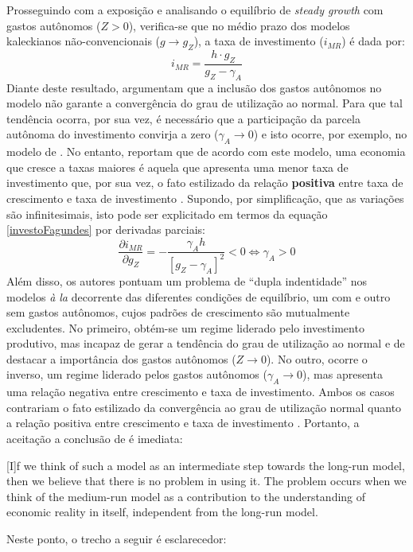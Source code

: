 Prosseguindo com a exposição e analisando o equilíbrio de \textit{steady growth} com gastos autônomos ($Z > 0$), verifica-se que no médio prazo dos modelos kaleckianos não-convencionais ($g\to g_Z$), a taxa de investimento ($i_{MR}$) é dada por:
\begin{equation}
\label{investoFagundes}
i_{MR} = \frac{h\cdot g_Z}{g_Z - \gamma_A}
\end{equation}
Diante deste resultado, \textcite{fagundes_role_2017} argumentam que a inclusão dos gastos autônomos no modelo não garante a convergência do grau de utilização ao normal. Para que tal tendência ocorra, por sua vez, é necessário que a participação da parcela autônoma do investimento convirja a zero ($\gamma_A \to 0$) e isto ocorre, por exemplo, no modelo de  \textcite{lavoie_convergence_2016}. 
No entanto, \textcite{fagundes_role_2017} reportam que de acordo com este modelo, uma economia que cresce a taxas maiores é aquela que apresenta uma menor taxa de investimento que, por sua vez, o fato estilizado da relação \textbf{positiva} entre taxa de crescimento e  taxa de investimento \cites{braga_investment_2018}{haluska_growth_2019}. Supondo, por simplificação, que as variações são infinitesimais, isto pode ser explicitado em termos da equação \ref{investoFagundes} por derivadas parciais:
$$
\frac{\partial i_{MR}}{\partial g_Z} = - \frac{\gamma_A h}{[g_Z - \gamma_A]^2} < 0 \Leftrightarrow \gamma_A > 0
$$
Além disso, os autores pontuam um problema de ``dupla indentidade'' nos modelos \textit{à la} \textcite{allain_tackling_2015} decorrente das diferentes condições de equilíbrio, um com e outro sem gastos autônomos, cujos padrões de crescimento são mutualmente excludentes. No primeiro, obtém-se um regime liderado pelo investimento produtivo, mas incapaz de gerar a tendência do grau de utilização ao normal e de destacar a importância dos gastos autônomos ($Z\to 0$). No outro, ocorre o inverso, um regime liderado pelos gastos autônomos ($\gamma_A \to 0$), mas apresenta uma relação negativa entre crescimento e taxa de investimento. Ambos os casos contrariam
o fato estilizado da convergência ao grau de utilização normal \cite{gahn_empirical_2019} quanto a relação positiva entre crescimento e taxa de investimento \cites{braga_investment_2018}{haluska_growth_2019}. Portanto, a aceitação a conclusão de \textcite[p.~13]{fagundes_role_2017} é imediata:

\begin{citacao}
	
	[I]f we think of such a model as an intermediate step towards the long-run model, then we
	believe that there is no problem in using it. The problem occurs when we think of the medium-run
	model as a contribution to the understanding of economic reality in itself, independent from the long-run model.
\end{citacao}
Neste ponto, o trecho a seguir é esclarecedor:

